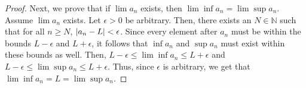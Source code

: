 \documentclass[12pt,letterpaper]{article}
\begin{document}
\begin{itemize}[leftmargin=!,labelindent=5pt]
\begin{itemize}
\begin{proof}
                    Next, we prove that if $\lim a_n$ exists, then $\lim \inf a_n = \lim \sup a_n$.
                    Assume $\lim a_n$ exists.
                    Let $\epsilon > 0$ be arbitrary.
                    Then, there exists an $N \in \mathbb{N}$ such that for all $n \geq N$, $\abs{a_n - L} < \epsilon$.
                    Since every element after $a_n$ must be within the bounds $L-\epsilon$ and $L + \epsilon$, it follows that $\inf a_n$ and $\sup a_n$ must exist within these bounds as well. 
                    Then, $L-\epsilon \leq \lim\inf a_n \leq L + \epsilon$ and $L-\epsilon \leq \lim\sup a_n \leq L + \epsilon$.
                    Thus, since $\epsilon$ is arbitrary, we get that $\lim\inf a_n = L = \lim\sup a_n$.
                \end{proof}
        \end{itemize}
\end{itemize}
\end{document}
